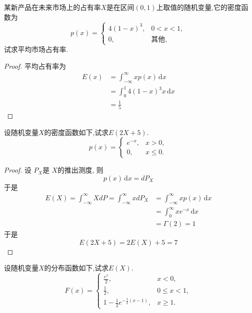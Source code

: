 \documentclass[../main.tex]{subfiles}
\begin{document}
\begin{exercise}{}{}
    某新产品在未来市场上的占有率$X$是在区间$(0,1)$上取值的随机变量,它的密度函数为
$$p(x) = \begin{cases} 4(1-x)^3, & 0 < x < 1, \\ 0, & \text{其他}, \end{cases}$$
试求平均市场占有率.
\end{exercise}
\begin{proof}
    平均占有率为 \[
    \begin{aligned}
    E\left( x \right)&=  \int_{-\infty}^{\infty}xp\left( x \right)\,\mathrm{d} x\\ 
     &=  \int_{0}^{1}4\left( 1-x \right)^{3}x\,\mathrm{d} x\\ 
      &= \frac{1 }{5 } 
    \end{aligned}
    \]
\end{proof}
\begin{exercise}{}{}
    设随机变量$X$的密度函数如下,试求$E(2X+5)$.
$$p(x) = \begin{cases} e^{-x}, & x > 0, \\ 0, & x \le 0. \end{cases}$$
\end{exercise}
\begin{proof}
    设 \(  P_{X}  \)是 \(  X  \)的推出测度, 则  \[
p\left( x \right)\,\mathrm{d} x= dP_{X} 
\] 于是\[
\begin{aligned}
E\left( X \right)=  \int_{-\infty}^{\infty}XdP= \int_{-\infty}^{\infty}x dP_{X}&= \int_{-\infty}^{\infty}xp\left( x \right)\,\mathrm{d} x   \\ 
 &=  \int_{0}^{\infty}xe^{-x}\,\mathrm{d} x\\ 
    &=  \Gamma \left( 2 \right)= 1 
\end{aligned}
\]于是 \[
E\left( 2X+ 5 \right)= 2E\left( X \right)+ 5  = 7
\]
\end{proof}
\begin{exercise}{}{}
    设随机变量$X$的分布函数如下,试求$E(X)$.
$$F(x) = \begin{cases} \frac{e^x}{2}, & x < 0, \\ \frac{1}{2}, & 0 \le x < 1, \\ 1 - \frac{1}{2}e^{-\frac{1}{2}(x-1)}, & x \ge 1. \end{cases}$$
\end{exercise}
\end{document}
